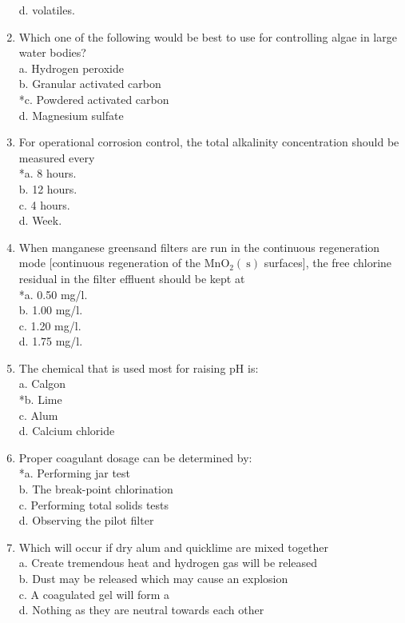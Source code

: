\begin{enumerate}
d. volatiles.\\
\item Which one of the following would be best to use for controlling algae in large water bodies?\\
a. Hydrogen peroxide\\
b. Granular activated carbon\\
*c. Powdered activated carbon\\
d. Magnesium sulfate
\item For operational corrosion control, the total alkalinity concentration should be measured every\\
*a. 8 hours.\\
b. 12 hours.\\
c. 4 hours.\\
d. Week.\\
\item When manganese greensand filters are run in the continuous regeneration mode [continuous regeneration of the $\mathrm{MnO}_{2}(\mathrm{~s})$ surfaces], the free chlorine residual in the filter effluent should be kept at\\
*a. 0.50 mg/l.\\
b. 1.00 mg/l.\\
c. 1.20 mg/l.\\
d. 1.75 mg/l.\\
\item The chemical that is used most for raising pH is:\\
a. Calgon\\
*b. Lime\\
c. Alum\\
d. Calcium chloride\\
\item Proper coagulant dosage can be determined by:\\
*a. Performing jar test\\
b. The break-point chlorination\\
c. Performing total solids tests\\
d. Observing the pilot filter\\
\item Which will occur if dry alum and quicklime are mixed together\\
a.	Create tremendous heat and hydrogen gas will be released\\
b.	Dust may be released which may cause an explosion\\
c.	A coagulated gel will form	a\\
d.	Nothing as they are neutral towards each other\\

\end{enumerate}
